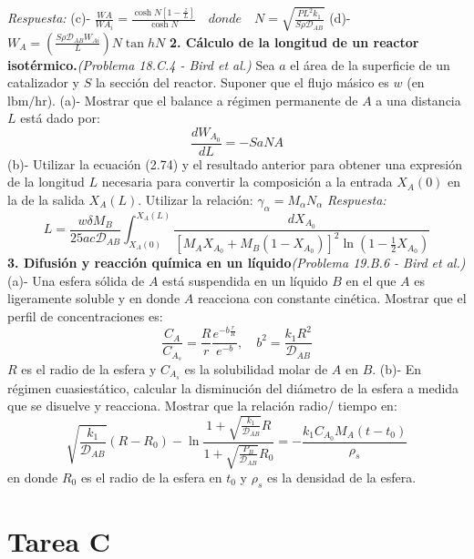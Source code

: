 \flushleft
\textit{Respuesta:}
\flushleft
(c)- \quad$
    \frac{WA}{WA_i} = \frac{\cosh N \left[1 - \frac{z}{L}\right]}{\cosh N} \quad donde \quad N=\sqrt{\frac{PL^{2}k_1}{S{\rho}\mathscr{D}_{AB}}}
    $
\flushleft
(d)- \quad$ W_A=(\frac{S{\rho}\mathscr{D}_{AB}W_{Ai}}{L})N \tan{h}N $
\flushleft
\vspace{0.5cm} 
\textbf{2. Cálculo de la longitud de un reactor isotérmico.}\textit{(Problema 18.C.4 - Bird et al.)}
\flushleft
Sea \( a \) el área de la superficie de un catalizador y \( S \) la sección del reactor. Suponer que el flujo másico es \( w \) (en \(\text{lbm}/\text{hr}\)).
\flushleft
(a)- Mostrar que el balance a régimen permanente de \( A \) a una distancia \( L \) está dado por:
 \[
    \frac{dW_{A_0}}{dL} = - S a N A
    \]
(b)- Utilizar la ecuación (2.74) y el resultado anterior para obtener una expresión de la longitud \( L \) necesaria para convertir la composición a la entrada \( X_A(0) \) en la de la salida \( X_A(L) \). Utilizar la relación:\quad
    $
    \gamma_\alpha = M_\alpha N_\alpha
    $
\flushleft
\textit{Respuesta:}
  \[
    L = \frac{w \delta M_B}{25 a c\mathscr{D}_{AB}} \int_{X_A(0)}^{X_A(L)} \frac{dX_{A_0}}{\left[ {M_A X_{A_0} + M_B (1 - X_{A_0})} \right]^2 \ln \left( 1 - \frac{1}{2} X_{A_0} \right)}
    \]
\flushleft
\vspace{0.5cm} 
\textbf{3. Difusión y reacción química en un líquido}\textit{(Problema 19.B.6 - Bird et al.)}
\flushleft
(a)- Una esfera sólida de \( A \) está suspendida en un líquido \( B \) en el que \( A \) es ligeramente soluble y en donde \( A \) reacciona con constante cinética. Mostrar que el perfil de concentraciones es:
\[
    \frac{C_A}{C_{A_s}} = \frac{R}{r} \frac{e^{-b\frac{r}{R}}}{e^{-b}}, \quad b^2 = \frac{k_1R^{2}}{\mathscr{D}_{AB}}
    \]
 \( R \) es el radio de la esfera y \( C_{A_s} \) es la solubilidad molar de \( A \) en \( B \).
 \flushleft
 (b)-  En régimen cuasiestático, calcular la disminución del diámetro de la esfera a medida que se disuelve y reacciona.  Mostrar que la relación radio/ tiempo en: 
   \[
    \sqrt{\frac{k_1}{\mathscr{D}_{AB}}} (R - R_0) - \ln \frac{1 + \sqrt{\frac{k_1}{\mathscr{D}_{AB}}} R}{1 + \sqrt{\frac{P_B}{\mathscr{D}_{AB}}} R_0} = -\frac{k_1 C_{A_0} M_A (t - t_0)}{\rho_s}
    \]
en donde \( R_0 \) es el radio de la esfera en \( t_0 \) y \( \rho_s \) es la densidad de la esfera.
\newpage
\section*{Tarea C}

